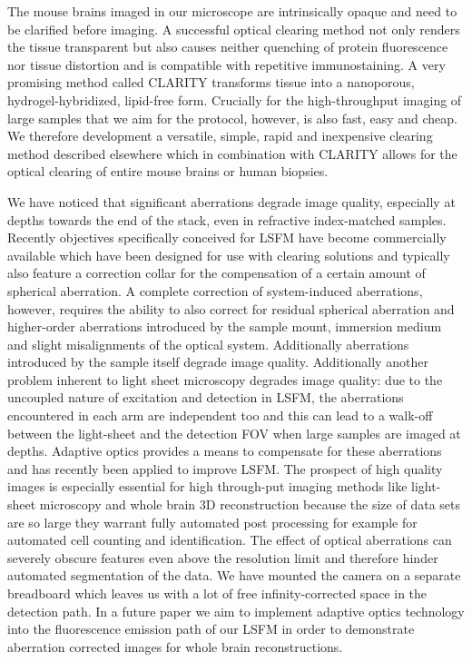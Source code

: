 \documentclass[12pt]{spieman}  %
\begin{document}
The mouse brains imaged in our microscope are intrinsically opaque and need to be clarified before imaging. A successful optical clearing method not only renders the tissue transparent but also causes neither quenching of protein fluorescence nor tissue distortion and is compatible with repetitive immunostaining. A very promising method called CLARITY\cite{Chung2013,Tomer2014} transforms tissue into a nanoporous, hydrogel-hybridized, lipid-free form. Crucially for the high-throughput imaging of large samples that we aim for the protocol, however, is also fast, easy and cheap. We therefore development a versatile, simple, rapid and inexpensive clearing method described elsewhere\cite{Costantini} which in combination with CLARITY allows for the optical clearing of entire mouse brains or human biopsies.

We have noticed that significant aberrations degrade image quality, especially at depths towards the end of the stack, even in refractive index-matched samples. Recently objectives specifically conceived for LSFM have become commercially available\cite{Marx2014} which have been designed for use with clearing solutions and typically also feature a correction collar for the compensation of a certain amount of spherical aberration. A complete correction of system-induced aberrations, however, requires the ability to also correct for residual spherical aberration and higher-order aberrations introduced by the sample mount, immersion medium and slight misalignments of the optical system. Additionally aberrations introduced by the sample itself degrade image quality. Additionally another problem inherent to light sheet microscopy degrades image quality: due to the uncoupled nature of excitation and detection in LSFM, the aberrations encountered in each arm are independent too and this can lead to a walk-off between the light-sheet and the detection FOV when large samples are imaged at depths. Adaptive optics\cite{Booth2007} provides a means to compensate for these aberrations and has recently been applied to improve LSFM\cite{Jorand2012,Wang2014}. The prospect of high quality images is especially essential for high through-put imaging methods like light-sheet microscopy and whole brain 3D reconstruction because the size of data sets are so large they warrant fully automated post processing for example for automated cell counting and identification\cite{Frasconi2014}. The effect of optical aberrations can severely obscure features even above the resolution limit and therefore hinder automated segmentation of the data. We have mounted the camera on a separate breadboard which leaves us with a lot of free infinity-corrected space in the detection path. In a future paper we aim to implement adaptive optics technology into the fluorescence emission path of our LSFM in order to demonstrate aberration corrected images for whole brain reconstructions. 
\end{document}
